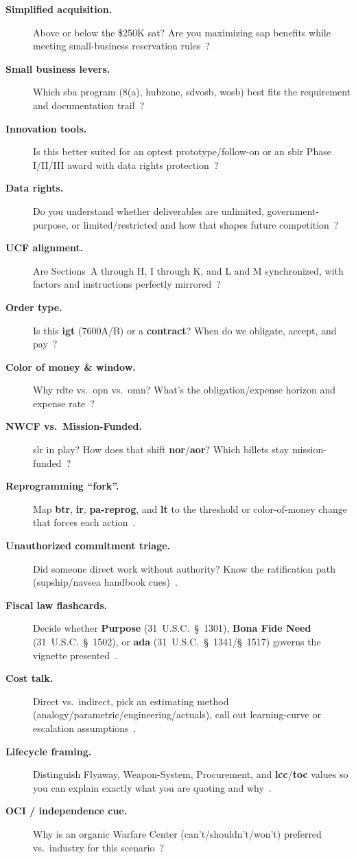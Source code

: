 \documentclass[../main.tex]{subfiles}
\begin{document}
\begin{description}
  \item[\textbf{Simplified acquisition.}] Above or below the \$250K \ac{sat}? Are you maximizing \ac{sap} benefits while meeting small-business reservation rules~\autocite{FAR}?
  \item[\textbf{Small business levers.}] Which \ac{sba} program (8(a), \ac{hubzone}, \ac{sdvosb}, \ac{wosb}) best fits the requirement and documentation trail~\autocite{FAR}?
  \item[\textbf{Innovation tools.}] Is this better suited for an \ac{optest} prototype/follow-on or an \ac{sbir} Phase I/II/III award with data rights protection~\autocite{USC-4021-OTA,USC-4022-OTF,USC-638-SBIR}?
  \item[\textbf{Data rights.}] Do you understand whether deliverables are unlimited, government-purpose, or limited/restricted and how that shapes future competition~\autocite{DFARS}?
  \item[\textbf{UCF alignment.}] Are Sections~A through H, I through K, and L and M synchronized, with factors and instructions perfectly mirrored~\autocite{FAR,NAVSEA-Source-Selection-Guide-2022}?
  \item[\textbf{Order type.}] Is this \textbf{\ac{igt}} (7600A/B) or a \textbf{contract}? When do we obligate, accept, and pay~\autocite{DoDFMR-Vol3,Treasury-GInvoicing}?
  \item[\textbf{Color of money \& window.}] Why \ac{rdte} vs.\ \ac{opn} vs.\ \ac{omn}? What's the obligation/expense horizon and expense rate~\autocite{DoDFMR-Vol3}?
  \item[\textbf{NWCF vs.\ Mission-Funded.}] \ac{slr} in play? How does that shift \textbf{\ac{nor}}/\textbf{\ac{aor}}? Which billets stay mission-funded~\autocite{DoDFMR-Vol3}?
  \item[\textbf{Reprogramming ``fork''.}] Map \textbf{\ac{btr}}, \textbf{\ac{ir}}, \textbf{\ac{pa-reprog}}, and \textbf{\ac{lt}} to the threshold or color-of-money change that forces each action~\autocite{DoDFMR-Vol3}.
  \item[\textbf{Unauthorized commitment triage.}] Did someone direct work without authority? Know the ratification path (\ac{supship}/\ac{navsea} handbook cues)~\autocite{SOM-Ch3-2023,NAVSEA-Contracts-Handbook-2023}.
  \item[\textbf{Fiscal law flashcards.}] Decide whether \textbf{Purpose} (31~U.S.C.~\S~1301), \textbf{Bona Fide Need} (31~U.S.C.~\S~1502), or \textbf{\ac{ada}} (31~U.S.C.~\S~1341/\S~1517) governs the vignette presented~\autocite{USC-1301-Purpose,USC-1502-BFN,USC-1341-ADA}.
  \item[\textbf{Cost talk.}] Direct vs.\ indirect, pick an estimating method (analogy/parametric/engineering/actuals), call out learning-curve or escalation assumptions~\autocite{DAU-AAF,FAR}.
  \item[\textbf{Lifecycle framing.}] Distinguish Flyaway, Weapon-System, Procurement, and \textbf{\ac{lcc}}/\textbf{\ac{toc}} values so you can explain exactly what you are quoting and why~\autocite{DoDI5000-85,SECNAV5000-2G}.
  \item[\textbf{OCI / independence cue.}] Why is an organic Warfare Center (can't/shouldn't/won't) preferred vs.\ industry for this scenario~\autocite{SECNAV5400-15D}?
\end{description}
\end{document}
